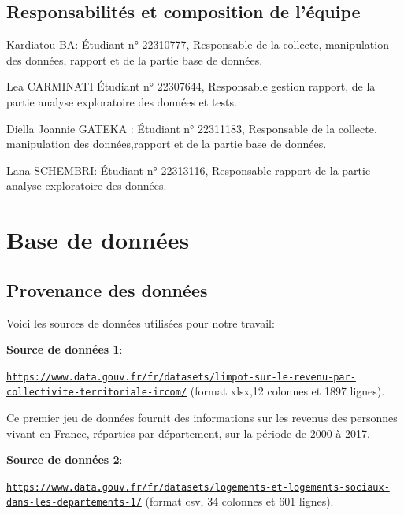 \documentclass[mstat,12pt]{unswthesis}
\begin{document}
\section{Responsabilités et composition de
l'équipe}\label{responsabilituxe9s-et-composition-de-luxe9quipe}

\medskip

Kardiatou BA: Étudiant n° 22310777, Responsable de la collecte,
manipulation des données, rapport et de la partie base de données.

\medskip

Lea CARMINATI Étudiant n° 22307644, Responsable gestion rapport, de la
partie analyse exploratoire des données et tests.

\medskip

Diella Joannie GATEKA : Étudiant n° 22311183, Responsable de la
collecte, manipulation des données,rapport et de la partie base de
données.

\medskip

Lana SCHEMBRI: Étudiant n° 22313116, Responsable rapport de la partie
analyse exploratoire des données.

\chapter{Base de données}\label{base-de-donnuxe9es}

\section{Provenance des données}\label{provenance-des-donnuxe9es}

Voici les sources de données utilisées pour notre travail:

\textbf{Source de données 1}:

\tiny

\texttt{\url{https://www.data.gouv.fr/fr/datasets/limpot-sur-le-revenu-par-collectivite-territoriale-ircom/}}
\normalsize (format xlsx,12 colonnes et 1897 lignes).

Ce premier jeu de données fournit des informations sur les revenus des
personnes vivant en France, réparties par département, sur la période de
2000 à 2017.

\bigskip

\textbf{Source de données 2}:

\tiny

\texttt{\url{https://www.data.gouv.fr/fr/datasets/logements-et-logements-sociaux-dans-les-departements-1/}}
\normalsize (format csv, 34 colonnes et 601 lignes).
\end{document}
